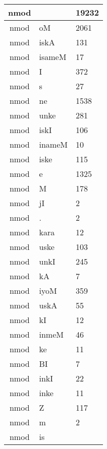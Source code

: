 \documentclass[a4 paper]{article}
\begin{document}
\begin{longtable}{cp{}p{}}
nmod &  & 19232\\ \midrule nmod & oM & 2061\\ \midrule nmod & iskA & 131\\ \midrule nmod & isameM & 17\\ \midrule nmod & I & 372\\ \midrule nmod & s & 27\\ \midrule nmod & ne & 1538\\ \midrule nmod & unke & 281\\ \midrule nmod & iskI & 106\\ \midrule nmod & inameM & 10\\ \midrule nmod & iske & 115\\ \midrule nmod & e & 1325\\ \midrule nmod & M & 178\\ \midrule nmod & jI & 2\\ \midrule nmod & . & 2\\ \midrule nmod & kara & 12\\ \midrule nmod & uske & 103\\ \midrule nmod & unkI & 245\\ \midrule nmod & kA & 7\\ \midrule nmod & iyoM & 359\\ \midrule nmod & uskA & 55\\ \midrule nmod & kI & 12\\ \midrule nmod & inmeM & 46\\ \midrule nmod & ke & 11\\ \midrule nmod & BI & 7\\ \midrule nmod & inkI & 22\\ \midrule nmod & inke & 11\\ \midrule nmod & Z & 117\\ \midrule nmod & m & 2\\ \midrule nmod & is
\end{longtable}
\end{document}
